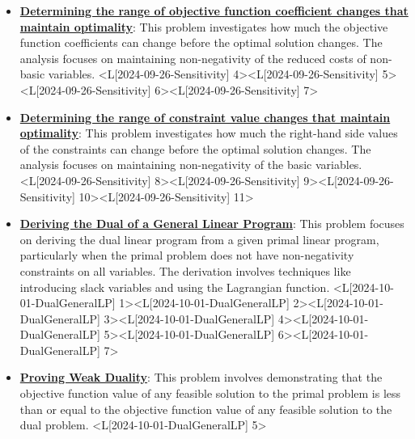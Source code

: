 \documentclass{article}%
\begin{document}
\begin{itemize}[[leftmargin=*]]%
\item \href{https://www.math.purdue.edu/~yipn/421/2024-09-26-Sensitivity.pdf#page=4}{\textbf{Determining the range of objective function coefficient changes that maintain optimality}}: This problem investigates how much the objective function coefficients can change before the optimal solution changes. The analysis focuses on maintaining non-negativity of the reduced costs of non-basic variables. <L[2024-09-26-Sensitivity] 4><L[2024-09-26-Sensitivity] 5><L[2024-09-26-Sensitivity] 6><L[2024-09-26-Sensitivity] 7>%
\item \href{https://www.math.purdue.edu/~yipn/421/2024-09-26-Sensitivity.pdf#page=8}{\textbf{Determining the range of constraint value changes that maintain optimality}}: This problem investigates how much the right-hand side values of the constraints can change before the optimal solution changes. The analysis focuses on maintaining non-negativity of the basic variables. <L[2024-09-26-Sensitivity] 8><L[2024-09-26-Sensitivity] 9><L[2024-09-26-Sensitivity] 10><L[2024-09-26-Sensitivity] 11>%
\end{itemize}%
\begin{itemize}[[leftmargin=*]]%
\item \href{https://www.math.purdue.edu/~yipn/421/2024-10-01-DualGeneralLP.pdf#page=1}{\textbf{Deriving the Dual of a General Linear Program}}: This problem focuses on deriving the dual linear program from a given primal linear program, particularly when the primal problem does not have non-negativity constraints on all variables. The derivation involves techniques like introducing slack variables and using the Lagrangian function. <L[2024-10-01-DualGeneralLP] 1><L[2024-10-01-DualGeneralLP] 2><L[2024-10-01-DualGeneralLP] 3><L[2024-10-01-DualGeneralLP] 4><L[2024-10-01-DualGeneralLP] 5><L[2024-10-01-DualGeneralLP] 6><L[2024-10-01-DualGeneralLP] 7>%
\item \href{https://www.math.purdue.edu/~yipn/421/2024-10-01-DualGeneralLP.pdf#page=5}{\textbf{Proving Weak Duality}}: This problem involves demonstrating that the objective function value of any feasible solution to the primal problem is less than or equal to the objective function value of any feasible solution to the dual problem. <L[2024-10-01-DualGeneralLP] 5>%
\end{itemize}%
\end{document}
